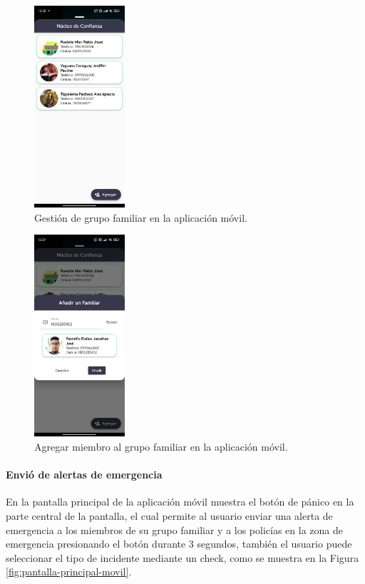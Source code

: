 \begin{figure}[H]
    \centering
    \includegraphics[width=0.3\textwidth]{chapters/III-resultados-y-discusion/resources/images/grupo-familiar-movil.png}
    \caption{Gestión de grupo familiar en la aplicación móvil.}
    \label{fig:grupo-familiar-movil}
\end{figure}

\begin{figure}[H]
    \centering
    \includegraphics[width=0.3\textwidth]{chapters/III-resultados-y-discusion/resources/images/agregar-miembro-movil.png}
    \caption{Agregar miembro al grupo familiar en la aplicación móvil.}
    \label{fig:agregar-miembro-movil}
\end{figure}

\paragraph{Envió de alertas de emergencia}
En la pantalla principal de la aplicación móvil muestra el botón de pánico en la parte central de la pantalla, el cual permite al usuario
enviar una alerta de emergencia a los miembros de su grupo familiar y a los policías en la zona de emergencia presionando el botón
durante 3 segundos, también el usuario puede seleccionar el tipo de incidente mediante un check, como se muestra en la Figura
\ref{fig:pantalla-principal-movil}.

